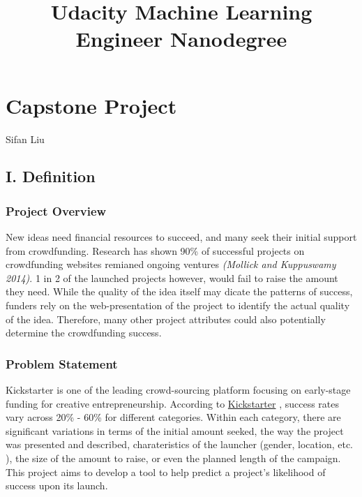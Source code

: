\documentclass[11pt]{article}
\title{Udacity Machine Learning Engineer Nanodegree}
\begin{document}
    
    
    \maketitle
    
    

    
    \section{Capstone Project}\label{capstone-project}

Sifan Liu

\subsection{I. Definition}\label{i.-definition}

\subsubsection{Project Overview}\label{project-overview}

New ideas need financial resources to succeed, and many seek their
initial support from crowdfunding. Research has shown 90\% of successful
projects on crowdfunding websites remianed ongoing ventures
\emph{(Mollick and Kuppuswamy 2014)}. 1 in 2 of the launched projects
however, would fail to raise the amount they need. While the quality of
the idea itself may dicate the patterns of success, funders rely on the
web-presentation of the project to identify the actual quality of the
idea. Therefore, many other project attributes could also potentially
determine the crowdfunding success.

\subsubsection{Problem Statement}\label{problem-statement}

Kickstarter is one of the leading crowd-sourcing platform focusing on
early-stage funding for creative entrepreneurship. According to
\href{https://www.kickstarter.com/help/stats}{Kickstarter} , success
rates vary across 20\% - 60\% for different categories. Within each
category, there are significant variations in terms of the initial
amount seeked, the way the project was presented and described,
charateristics of the launcher (gender, location, etc. ), the size of
the amount to raise, or even the planned length of the campaign. This
project aims to develop a tool to help predict a project's likelihood of
success upon its launch.
\end{document}
